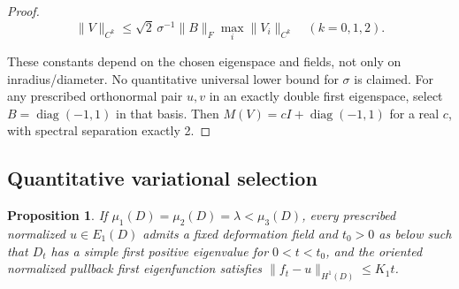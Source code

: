 \documentclass[11pt]{article}
\newtheorem{proposition}[theorem]{Proposition}
\theoremstyle{definition}
\theoremstyle{remark}
\numberwithin{equation}{section}
\begin{document}
\begin{proof}
\begin{equation}\label{eq:src-11-06}
\|V\|_{C^k}\le\sqrt2\,\sigma^{-1}\|B\|_F\max_i\|V_i\|_{C^k}\quad(k=0,1,2).
\end{equation}

These constants depend on the chosen eigenspace and fields, not only on inradius/diameter. No quantitative universal lower bound for $\sigma$ is claimed. For any prescribed orthonormal pair $u,v$ in an exactly double first eigenspace, select $B=\operatorname{diag}(-1,1)$ in that basis. Then $M(V)=cI+\operatorname{diag}(-1,1)$ for a real $c$, with spectral separation exactly 2.

\end{proof}
\subsection{Quantitative variational selection}\label{subsec:11.2}
\begin{proposition}\label{prop:selection}
If $\mu_1(D)=\mu_2(D)=\lambda<\mu_3(D)$, every prescribed normalized $u\in E_1(D)$ admits a fixed deformation field and $t_0>0$ as below such that $D_t$ has a simple first positive eigenvalue for $0<t<t_0$, and the oriented normalized pullback first eigenfunction satisfies $\|f_t-u\|_{H^1(D)}\le K_1t$.
\end{proposition}
\end{document}

